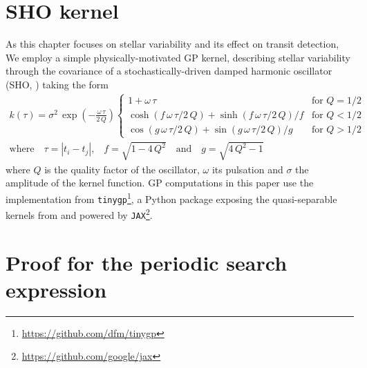 \documentclass[modern]{aastex631}
\begin{document}
\newpage
\appendix
\section{SHO kernel}\label{app_gp}
As this chapter focuses on stellar variability and its effect on transit detection, We employ a simple physically-motivated GP kernel, describing stellar variability through the covariance of a stochastically-driven damped harmonic oscillator (SHO, \citealt{celerite, celerite2}) taking the form 
\begin{equation}
    \begin{gathered}
        k(\tau) = \sigma^2\,\exp\left(-\frac{\omega\,\tau}{2\,Q}\right)
        \left\{\begin{array}{ll}
            1 + \omega\,\tau & \mbox{for } Q = 1/2 \\
            \cosh(f\,\omega\,\tau/2\,Q) + \sinh(f\,\omega\,\tau/2\,Q)/f
                & \mbox{for } Q < 1/2 \\
            \cos(g\,\omega\,\tau/2\,Q) + \sin(g\,\omega\,\tau/2\,Q)/g
                & \mbox{for } Q > 1/2
        \end{array}\right. \\
        \text{where}\quad \tau = |t_i - t_j|\text{,}\quad f = \sqrt{1 - 4\,Q^2} \quad \text{and}\quad g = \sqrt{4\,Q^2 - 1}
    \end{gathered}
\end{equation}
where $Q$ is the quality factor of the oscillator, $\omega$ its pulsation and $\sigma$ the amplitude of the kernel function. GP computations in this paper use the implementation from \texttt{tinygp}\footnote{\href{https://github.com/dfm/tinygp}{https://github.com/dfm/tinygp}}, a Python package exposing the quasi-separable kernels from \cite{celerite2} and powered by \texttt{JAX}\footnote{\href{https://github.com/google/jax}{https://github.com/google/jax}}.

\section{Proof for the periodic search expression}\label{proof}
\end{document}
